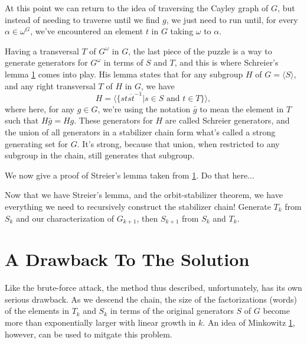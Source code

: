 \documentclass[12pt]{article}
\begin{document}
At this point we can return to the idea of traversing the Cayley graph of $G$,
but instead of needing to traverse until we find $g$, we just need to run until,
for every $\alpha\in\omega^G$,
we've encountered an element $t$ in $G$ taking $\omega$ to $\alpha$.

Having a transversal $T$ of $G^\omega$ in $G$, the last piece of the
puzzle is a way to generate generators for $G^\omega$ in terms
of $S$ and $T$, and this is where Schreier's lemma \ref{} comes into play.
His lemma states that for any subgroup $H$ of $G=\langle S\rangle$, and
any right transversal $T$ of $H$ in $G$, we have
\begin{equation*}
H = \langle\{st\overline{st}^{-1}|\mbox{$s\in S$ and $t\in T$}\}\rangle,
\end{equation*}
where here, for any $g\in G$, we're using the notation $\bar{g}$ to
mean the element in $T$ such that $H\bar{g}=H g$.
These generators for $H$ are called Schreier generators, and the union of all generators in
a stabilizer chain form what's called a strong generating set for $G$.
It's strong, because that union, when restricted to any subgroup in
the chain, still generates that subgroup.

We now give a proof of Streier's lemma taken from \ref{}.  Do that here...

Now that we have Streier's lemma, and the orbit-stabilizer theorem, we have everything
we need to recursively construct the stabilizer chain!  Generate $T_k$ from
$S_k$ and our characterization of $G_{k+1}$, then $S_{k+1}$ from $S_k$ and $T_k$.

\section{A Drawback To The Solution}

Like the brute-force attack, the method thus described, unfortunately, has its
own serious drawback.  As we descend the chain, the size of the factorizations
(words) of the elements in $T_k$ and $S_k$ in terms of the original generators
$S$ of $G$ become more than exponentially larger with linear growth in $k$.
An idea of Minkowitz \ref{}, however, can be used to mitgate this problem.
\end{document}
